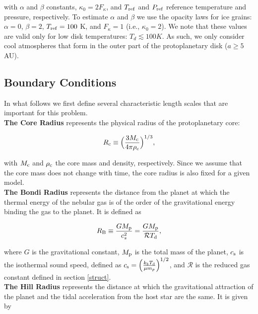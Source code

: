 \documentclass[apj]{emulateapj}
\newcommand{\co}{_{\rm c}}
\newcommand{\di}{_{\rm d}}
\begin{document}
\noindent with $\alpha$ and $\beta$ constants, $\kappa_0=2 F_{\kappa}$, and $T_{\rm{ref}}$ and $P_{\rm{ref}}$ reference temperature and pressure, respectively. To estimate $\alpha$ and $\beta$ we use the \citet{bell94} opacity laws for ice grains: $\alpha =0 $, $\beta=2$, $T_{\rm{ref}}=100$ K, and $F_{\kappa}=1$ (i.e., $\kappa_0=2$). We note that these values are valid only for low disk temperatures: $T_d \lesssim 100 K$. As such, we only consider cool atmospheres that form in the outer part of the protoplanetary disk ($a \geq 5$ AU).

\subsection{Boundary Conditions}
\label{BCs}


In what follows we first define several characteristic length scales that are important for this problem. \\

\textbf{The Core Radius} represents the physical radius of the protoplanetary core:

\begin{equation}
\label{eq:rc}
R\co \equiv \Big(\frac{3 M\co}{4 \pi \rho\co}\Big)^{1/3},
\end{equation}

\noindent with $M\co$ and $\rho\co$ the core mass and density, respectively. Since we assume that the core mass does not change with time, the core radius is also fixed for a given model. \\

\textbf{The Bondi Radius} represents the distance from the planet at which the thermal energy of the nebular gas is of the order of the gravitational energy binding the gas to the planet. It is defined as

\begin{equation}
\label{eq:RB}
R_{\rm B} \equiv \frac{G M_{\rm p}}{c_s^2}=\frac{G M_{\rm p}}{\mathcal{R} T\di},
\end{equation}

\noindent where $G$ is the gravitational constant, $M_{\rm p}$ is the total mass of the planet, $c_{\rm s}$ is the isothermal sound speed, defined as $c_{\rm s}=\Big(\frac{k_b T\di}{\mu m_p}\Big)^{1/2}$, and $\mathcal{R}$ is the reduced gas constant defined in section \ref{struct}.\\


\textbf{The Hill Radius} represents the distance at which the gravitational attraction of the planet and the tidal acceleration from the host star are the same. It is given by
\end{document}
